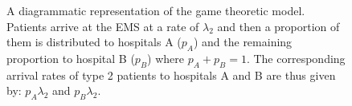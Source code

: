 \begin{figure}[H]
\begin{minipage}{.55\textwidth}
    \end{minipage}
    \caption{A diagrammatic representation of the game theoretic model.
    Patients arrive at the EMS at a rate of \( \lambda_2 \) and then a
    proportion of them is distributed to hospitals A (\(p_A\)) and the
    remaining proportion to hospital B (\(p_B\)) where \(p_A + p_B = 1\).
    The corresponding arrival rates of type 2 patients to hospitals A and B are
    thus given by: \( p_A \lambda_2 \) and \( p_B \lambda_2 \).}
    \label{fig:diagram_of_game_theoretic_model}
\end{figure}